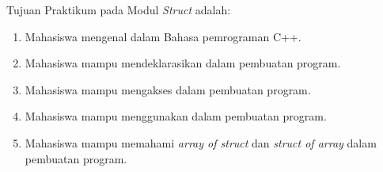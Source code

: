 \documentclass[../main.tex]{subfiles}
\begin{document}
    \noindent Tujuan Praktikum pada Modul {\thechapter} \textit{Struct} adalah:
    \begin{enumerate}
        \item Mahasiswa mengenal {\struct} dalam Bahasa pemrograman C++.
        \item Mahasiswa mampu mendeklarasikan {\struct} dalam pembuatan program.
        \item Mahasiswa mampu mengakses {\struct} dalam pembuatan program.
        \item Mahasiswa mampu menggunakan {\nested} {\struct} dalam pembuatan program.
        \item Mahasiswa mampu memahami \textit{array of struct} dan \textit{struct of array} dalam pembuatan program.
    \end{enumerate}
\end{document}
